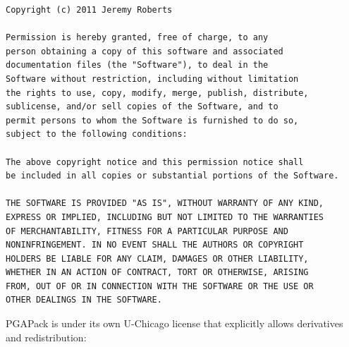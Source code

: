 \documentclass[letterpaper,11pt,english]{sphinxmanual}
\begin{document}
\begin{Verbatim}[commandchars=\\\{\}]
Copyright (c) 2011 Jeremy Roberts

Permission is hereby granted, free of charge, to any 
person obtaining a copy of this software and associated 
documentation files (the "Software"), to deal in the 
Software without restriction, including without limitation 
the rights to use, copy, modify, merge, publish, distribute, 
sublicense, and/or sell copies of the Software, and to 
permit persons to whom the Software is furnished to do so, 
subject to the following conditions:

The above copyright notice and this permission notice shall 
be included in all copies or substantial portions of the Software.

THE SOFTWARE IS PROVIDED "AS IS", WITHOUT WARRANTY OF ANY KIND, 
EXPRESS OR IMPLIED, INCLUDING BUT NOT LIMITED TO THE WARRANTIES 
OF MERCHANTABILITY, FITNESS FOR A PARTICULAR PURPOSE AND 
NONINFRINGEMENT. IN NO EVENT SHALL THE AUTHORS OR COPYRIGHT 
HOLDERS BE LIABLE FOR ANY CLAIM, DAMAGES OR OTHER LIABILITY, 
WHETHER IN AN ACTION OF CONTRACT, TORT OR OTHERWISE, ARISING 
FROM, OUT OF OR IN CONNECTION WITH THE SOFTWARE OR THE USE OR 
OTHER DEALINGS IN THE SOFTWARE.
\end{Verbatim}

PGAPack is under its own U-Chicago license that explicitly allows derivatives and redistribution:
\end{document}
